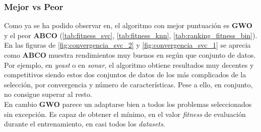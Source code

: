 \subsubsection{Mejor vs Peor}
Como ya se ha podido observar en, el algoritmo con mejor puntuación es \textbf{GWO} y el peor \textbf{ABCO} (\ref{tab:fitness_svc}, \ref{tab:fitness_knn}, \ref{tab:ranking_fitness_bin}). \\[6pt]
En las figuras de \ref{fig:convergencia_svc_2} y \ref{fig:convergencia_svc_1} se aprecia como \textbf{ABCO} muestra rendimientos muy buenos en según que conjunto de datos. Por ejemplo, en \textit{yeast} o en \textit{sonar}, el algoritmo obtiene resultados muy decentes y competitivos siendo estos dos conjuntos de datos de los más complicados de la selección, por convergencia y número de características. Pese a ello, en conjunto, no consigue superar al resto.\\[6pt]
En cambio \textbf{GWO} parece un adaptarse bien a todos los problemas seleccionados sin excepción. Es capaz de obtener el mínimo, en el valor \textit{fitness} de evaluación durante el entrenamiento, en casi todos los \textit{datasets}.

